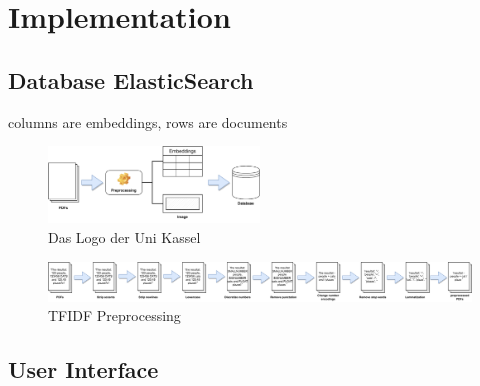 \chapter{Implementation}\label{ch:implementation}

\section{Database ElasticSearch}\label{subsec:db}
columns are embeddings, rows are documents

\begin{figure}[htp] %
    \centering
    \includegraphics[width=0.5\textwidth]{images/PDFs_to_database.pdf}
    \caption{Das Logo der Uni Kassel}
    \label{fig:pdf2db}
\end{figure}

\begin{figure}[htp] %
    \centering
    \includegraphics[width=1.0\textwidth]{images/TFIDF_preprocessing}
    \caption{TFIDF Preprocessing}
    \label{fig:preprocessing}
\end{figure}

\section{User Interface}\label{sec:ui}